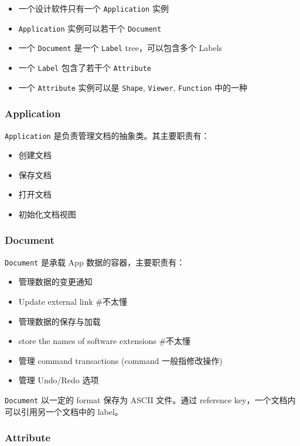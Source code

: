 \documentclass[11pt]{article}
\begin{document}
\begin{itemize}
\item 一个设计软件只有一个 \texttt{Application} 实例
\item \texttt{Application} 实例可以若干个 \texttt{Document}
\item 一个 \texttt{Document} 是一个 \texttt{Label} tree，可以包含多个 Labels
\item 一个 \texttt{Label} 包含了若干个 \texttt{Attribute}
\item 一个 \texttt{Attribute} 实例可以是 \texttt{Shape}, \texttt{Viewer}, \texttt{Function} 中的一种
\end{itemize}
\subsubsection{Application}
\label{sec:org1a93eb7}

\texttt{Application} 是负责管理文档的抽象类。其主要职责有：

\begin{itemize}
\item 创建文档
\item 保存文档
\item 打开文档
\item 初始化文档视图
\end{itemize}
\subsubsection{Document}
\label{sec:orgd3b4733}

\texttt{Document} 是承载 App 数据的容器，主要职责有：

\begin{itemize}
\item 管理数据的变更通知
\item Update external link \#不太懂
\item 管理数据的保存与加载
\item store the names of software extensions \#不太懂
\item 管理 command transactions (command 一般指修改操作)
\item 管理 Undo/Redo 选项
\end{itemize}

\texttt{Document} 以一定的 format 保存为 ASCII 文件。通过 reference key，一个文档内可以引用另一个文档中的 label。
\subsubsection{Attribute}
\label{sec:org5cdac16}
\end{document}
